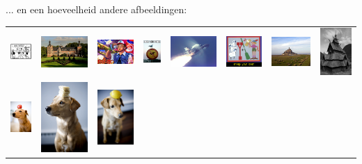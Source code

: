 \documentclass{beamer}
\begin{document}
\begin{frame}
  ... en een hoeveelheid andere afbeeldingen:

  \centering

  \begin{tabular}{cccccccc}
    \includegraphics[height=.3in,width=.3in,keepaspectratio]{../images/01.jpg} &
    \includegraphics[height=.3in,width=.3in,keepaspectratio]{../images/02.jpg} &
    \includegraphics[height=.3in,width=.3in,keepaspectratio]{../images/03.jpg} &
    \includegraphics[height=.3in,width=.3in,keepaspectratio]{../images/04.jpg} &
    \includegraphics[height=.3in,width=.3in,keepaspectratio]{../images/05.jpg} &
    \includegraphics[height=.3in,width=.3in,keepaspectratio]{../images/06.png} &
    \includegraphics[height=.3in,width=.3in,keepaspectratio]{../images/07.jpg} &
    \includegraphics[height=.3in,width=.3in,keepaspectratio]{../images/08.jpg} \\
    \includegraphics[height=.3in,width=.3in,keepaspectratio]{../images/09.jpg} &
    \includegraphics[height=.3in,width=.3in,keepaspectratio]{../images/10.jpg} &
    \includegraphics[height=.3in,width=.3in,keepaspectratio]{../images/11.jpg} &

\end{tabular}
\end{frame}
\end{document}
